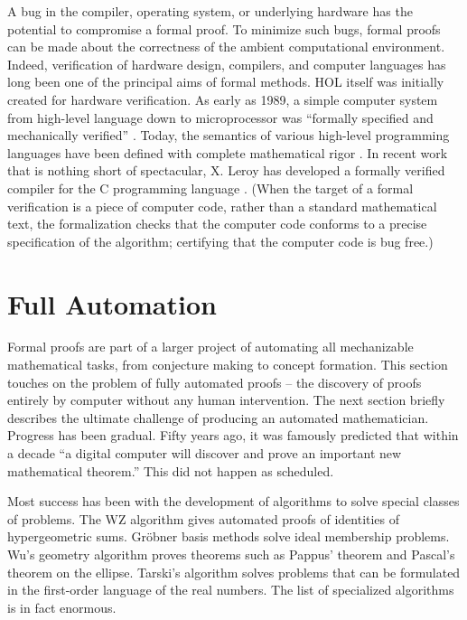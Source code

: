 \documentclass{llncs}
\begin{document}
A bug in the compiler, operating system,
or underlying hardware has the potential to compromise a formal proof. 
To minimize such bugs, formal proofs can be made about the
correctness of the ambient
computational environment.
Indeed, verification of hardware design, 
compilers, and computer
languages has long been one of the principal aims of formal methods.
HOL itself was initially created for hardware verification.
As early as 1989, a simple computer system from high-level language down to microprocessor was ``formally specified and mechanically
verified'' \cite{BHMY}.
Today, the semantics of various
high-level programming languages have been defined with complete mathematical
rigor \cite{Harper}.  
In recent work that is nothing short of spectacular, X. Leroy has
developed a formally verified compiler for the C programming
language \cite{CC}.  
(When
the target of a formal verification is a piece of computer code, rather
than a standard mathematical text, the formalization checks that the
computer code conforms to a precise specification 
of the algorithm; certifying that the computer code is bug free.)


\section{Full Automation}

Formal proofs are part of a larger project
of automating all 
mechanizable mathematical tasks, from conjecture making to concept formation.  
This section touches on the problem of fully automated proofs
-- the discovery of proofs
entirely by computer without any human intervention.  The next section
briefly describes the ultimate challenge of producing an automated mathematician.
Progress has been gradual.
Fifty years ago, it was famously predicted that
within a decade ``a digital computer will discover and prove
an important new mathematical theorem.''
This did not happen as scheduled.


Most success has been with
the development of algorithms to solve special classes
of problems.  The WZ algorithm  gives  automated proofs of identities
of hypergeometric sums.   Gr\"obner basis
methods solve ideal membership problems.
Wu's geometry algorithm proves theorems such as
Pappus' theorem
and Pascal's theorem on the ellipse.
Tarski's algorithm  solves
problems that can be formulated in the first-order language of the real numbers.
The list of specialized algorithms is in fact enormous.
\end{document}
